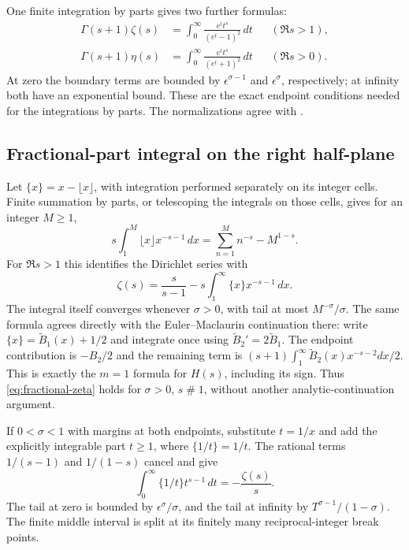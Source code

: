 One finite integration by parts gives two further formulas:
\begin{align*}
 \Gamma(s+1)\zeta(s)
   &=\int_0^\infty\frac{e^t t^s}{(e^t-1)^2}\,dt
       &&(\Re s>1),\\
 \Gamma(s+1)\eta(s)
   &=\int_0^\infty\frac{e^t t^s}{(e^t+1)^2}\,dt
       &&(\Re s>0).
\end{align*}
At zero the boundary terms are bounded by $\epsilon^{\sigma-1}$
and $\epsilon^\sigma$, respectively; at infinity both have an
exponential bound. These are the exact endpoint conditions needed for
the integrations by parts. The normalizations agree with
\cite[\S25.5]{DLMF25_5}.

\subsection{Fractional-part integral on the right half-plane}
\label{subsec:fractional}
Let $\{x\}=x-\lfloor x\rfloor$, with integration performed separately
on its integer cells. Finite summation by parts, or telescoping the
integrals on those cells, gives for an integer $M\ge1$,
\[
 s\int_1^M\lfloor x\rfloor x^{-s-1}\,dx
       =\sum_{n=1}^M n^{-s}-M^{1-s}.
\]
For $\Re s>1$ this identifies the Dirichlet series with
\begin{equation}
 \zeta(s)=\frac{s}{s-1}
           -s\int_1^\infty\{x\}x^{-s-1}\,dx.
 \label{eq:fractional-zeta}
\end{equation}
The integral itself converges whenever $\sigma>0$, with tail at most
$M^{-\sigma}/\sigma$. The same formula agrees directly with the
Euler--Maclaurin continuation there: write
$\{x\}=\widetilde B_1(x)+1/2$ and integrate once using
$\widetilde B_2'=2\widetilde B_1$. The endpoint contribution is
$-B_2/2$ and the remaining term is
$(s+1)\int_1^\infty\widetilde B_2(x)x^{-s-2}dx/2$.
This is exactly the $m=1$ formula for $H(s)$, including its sign.
Thus \eqref{eq:fractional-zeta} holds for $\sigma>0$, $s\mathrel\#1$,
without another analytic-continuation argument.

If $0<\sigma<1$ with margins at both endpoints, substitute $t=1/x$
and add the explicitly integrable part $t\ge1$, where $\{1/t\}=1/t$.
The rational terms $1/(s-1)$ and $1/(1-s)$ cancel and give
\begin{equation}
 \boxed{\displaystyle
 \int_0^\infty\{1/t\}t^{s-1}\,dt=-\frac{\zeta(s)}s.}
 \label{eq:mathworld-fractional}
\end{equation}
The tail at zero is bounded by $\epsilon^\sigma/\sigma$, and the tail
at infinity by $T^{\sigma-1}/(1-\sigma)$. The finite middle interval
is split at its finitely many reciprocal-integer break points.

